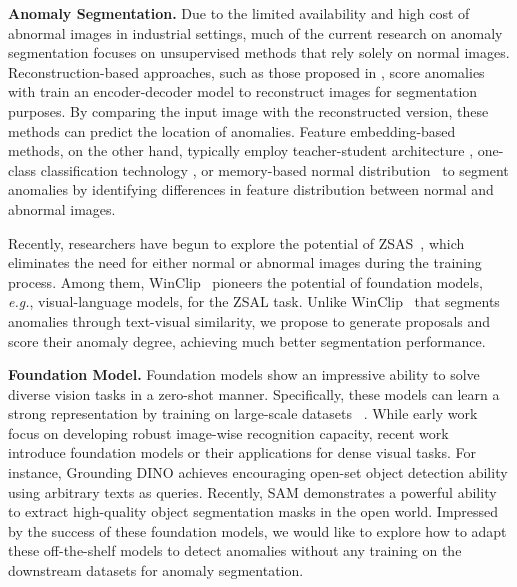 \documentclass{article}
\begin{document}
\noindent\textbf{Anomaly Segmentation. } Due to the limited availability and high cost of abnormal images in industrial settings, much of the current research on anomaly segmentation focuses on unsupervised methods that rely solely on normal images. Reconstruction-based approaches, such as those proposed in \cite{zhou2020encoding,hou2021divide,zavrtanik2021draem,matsubara2020deep,yan2021learning,jiang2022masked}, score anomalies with 
train an encoder-decoder model to reconstruct images for segmentation purposes. By comparing the input image with the reconstructed version, these methods can predict the location of anomalies. Feature embedding-based methods, on the other hand, typically employ teacher-student architecture \cite{salehi2021multiresolution,wang2021student,deng2022anomaly,cao2022informative, cao2022semikd, wan_unsupervised_2022, wan_position_2022, cao_collaborative_2023}, one-class classification technology \cite{yi2020patch,massoli2021mocca,sohn2020learning}, or memory-based normal distribution~\cite{roth2022towards, wan_industrial_2022, cao2023complementary} to segment anomalies by identifying differences in feature distribution between normal and abnormal images. 

Recently, researchers have begun to explore the potential of ZSAS~\cite{nagy2022zero,liu2021zero,rivera2020anomaly,aota2023zero}, which eliminates the need for either normal or abnormal images during the training process. Among them, WinClip~\cite{jeong2023winclip} pioneers the potential of foundation models, \textit{e.g.}, visual-language models, for the ZSAL task. Unlike WinClip~\cite{jeong2023winclip} that segments anomalies through text-visual similarity, we propose to generate proposals and score their anomaly degree, achieving much better segmentation performance.

\noindent\textbf{Foundation Model.} 
Foundation models show an impressive ability to solve diverse vision tasks in a zero-shot manner. Specifically, these models can learn a strong representation by training on large-scale datasets ~\cite{Laion400}. While early work~\cite{radford2021learning,li2021align} focus on developing robust image-wise recognition capacity, recent work~\cite{lu2022unified,wang2022unifying, rao2022denseclip,zhong2022regionclip,zhou2021denseclip,liu2023grounding} introduce foundation models or their applications for dense visual tasks. For instance, Grounding DINO \cite{liu2023grounding} achieves encouraging open-set object detection ability using arbitrary texts as queries. Recently, SAM \cite{kirillov2023segment} demonstrates a powerful ability to extract high-quality object segmentation masks in the open world. Impressed by the success of these foundation models, we would like to explore how to adapt these off-the-shelf models to detect anomalies without any training on the downstream datasets for anomaly segmentation.
\end{document}
